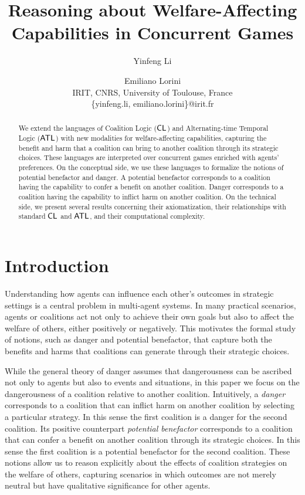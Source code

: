 \documentclass{article}
\title{Reasoning about Welfare-Affecting Capabilities in Concurrent Games}
\author{
Yinfeng Li \and
Emiliano Lorini\\
\affiliations
IRIT, CNRS, University of Toulouse,  France\\
\emails
\{yinfeng.li, emiliano.lorini\}@irit.fr
}
\begin{document}
\maketitle
 
\begin{abstract}

We extend the languages of Coalition Logic ($\mathsf{CL} $) and Alternating-time Temporal Logic ($\mathsf{ATL}$) with new modalities for welfare-affecting capabilities, capturing the benefit and harm that a coalition can bring to another coalition through its strategic choices. These languages are interpreted over concurrent games enriched with agents' preferences. On the conceptual side, we use these languages to formalize the notions of potential benefactor and danger. A potential benefactor corresponds to a coalition having the capability to confer a benefit on another coalition. Danger corresponds to a coalition having the capability to inflict harm on another coalition.  On the technical side, we present several results concerning their axiomatization, their relationships with standard $\mathsf{CL} $ and $\mathsf{ATL}$, and their computational complexity.



\end{abstract}

 


 

\section{Introduction}


Understanding how agents can influence each other’s outcomes in strategic settings is a central problem in multi-agent systems. In many practical scenarios, agents or coalitions act not only to achieve their own goals but also to affect the welfare  of others, either positively or negatively. This motivates the formal study of  notions, 
such as danger and  
potential benefactor, 
that capture both the benefits and  harms that coalitions can generate through their strategic choices.

While the general theory
of danger assumes
that dangerousness can be ascribed
not only to agents but also to
events and situations, in this paper
we focus on the dangerousness of a coalition
relative to another coalition. 
Intuitively,
a 
\emph{danger} corresponds to 
a
coalition that can inflict harm on another coalition 
by selecting a particular strategy.
In this sense the first coalition
is a danger for the second coalition.
Its
positive counterpart 
\emph{potential benefactor} corresponds to 
a coalition that can confer a benefit
on another coalition through its strategic choices. 
In this sense the first coalition
is a potential benefactor  for the second coalition.
These notions allow us to reason explicitly about the effects of coalition strategies on the welfare of others, capturing scenarios in which outcomes are not merely neutral but have qualitative significance for other agents.
\end{document}
